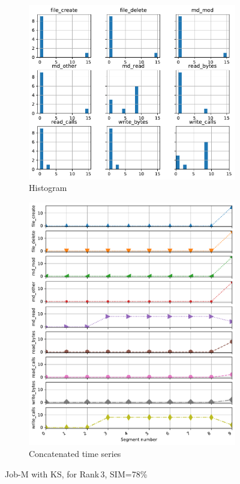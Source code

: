 \documentclass{jhps}
\begin{document}
\begin{figure}[bt]
\begin{subfigure}{0.5\textwidth}
\centering
\includegraphics[width=\textwidth]{job_similarities_5024292-out/ks-0.7863--ks-2hist7827264}
\caption{Histogram}
\end{subfigure}
\qquad
\begin{subfigure}{0.36\textwidth}
\centering
\includegraphics[width=\textwidth]{job_similarities_5024292-out/ks-0.7863--ks-2timeseries7827264}
\caption{Concatenated time series}
\end{subfigure}

\caption{Job-M with KS, for Rank\,3, SIM=78\%}%
\label{fig:job-M-ks}
\end{figure}
\end{document}

